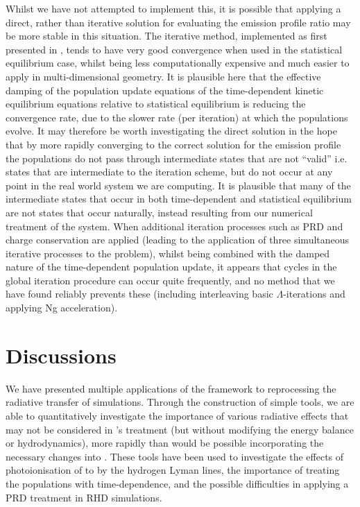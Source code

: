 Whilst we have not attempted to implement this, it is possible that applying a direct, rather than iterative solution for evaluating the emission profile ratio may be more stable in this situation.
The iterative method, implemented as first presented in \citet{Uitenbroek2001}, tends to have very good convergence when used in the statistical equilibrium case, whilst being less computationally expensive and much easier to apply in multi-dimensional geometry.
It is plausible here that the effective damping of the population update equations of the time-dependent kinetic equilibrium equations relative to statistical equilibrium is reducing the convergence rate, due to the slower rate (per iteration) at which the populations evolve.
It may therefore be worth investigating the direct solution in the hope that by more rapidly converging to the correct solution for the emission profile the populations do not pass through intermediate states that are not ``valid'' i.e. states that are intermediate to the iteration scheme, but do not occur at any point in the real world system we are computing.
It is plausible that many of the intermediate states that occur in both time-dependent and statistical equilibrium are not states that occur naturally, instead resulting from our numerical treatment of the system.
When additional iteration processes such as PRD and charge conservation are applied (leading to the application of three simultaneous iterative processes to the problem), whilst being combined with the damped nature of the time-dependent population update, it appears that cycles in the global iteration procedure can occur quite frequently, and no method that we have found reliably prevents these (including interleaving basic $\Lambda$-iterations and applying Ng acceleration).

\section{Discussions}

We have presented multiple applications of the \Lw{} framework to reprocessing the radiative transfer of \Radyn{} simulations.
Through the construction of simple tools, we are able to quantitatively investigate the importance of various radiative effects that may not be considered in \Radyn{}'s treatment (but without modifying the energy balance or hydrodynamics), more rapidly than would be possible incorporating the necessary changes into \Radyn{}.
These tools have been used to investigate the effects of photoionisation of \Caii{} to \Caiii{} by the hydrogen Lyman lines, the importance of treating the \Caii{} populations with time-dependence, and the possible difficulties in applying a PRD treatment in RHD simulations.

